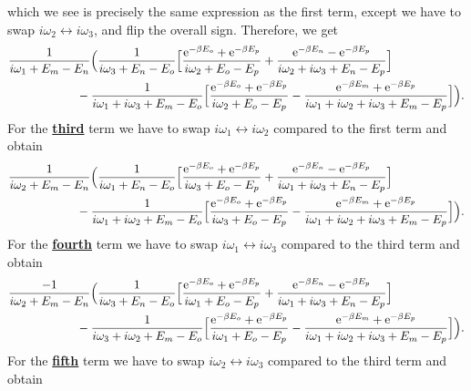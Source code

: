 \documentclass[12pt,a4paper]{scrartcl}
\numberwithin{equation}{section}
\renewcommand{\exp}[1]{\mathrm{e}^{#1}}
\begin{document}
which we see is precisely the same expression as the first term, except we have to swap $i\omega_2 \leftrightarrow i\omega_3$,
and flip the overall sign.
Therefore, we get
\begin{align}
   & 
 \frac{1}{i\omega_1 +E_m-E_n}
 \Big( \frac{1}{i\omega_3 +E_n-E_o}
 \Big[
 \frac{\exp{-\beta E_o}+\exp{-\beta E_p} }{i\omega_2 +E_o-E_p} 
  + \frac{ \exp{-\beta E_n} - \exp{-\beta E_p} }{ i\omega_2 + i\omega_3 + E_n- E_p } 
 \Big] \nonumber \\
 & \hspace*{2cm} -  \frac{1}{i\omega_1+ i\omega_3 + E_m-E_o}
 \Big[
  \frac{\exp{-\beta E_o}+\exp{-\beta E_p} }{i\omega_2 +E_o-E_p} 
 -  \frac{ \exp{-\beta E_m}+\exp{-\beta E_p} }{ i\omega_1 + i\omega_2 + i\omega_3 + E_m- E_p } 
 \Big]
 \Big)  .
\end{align}
For the \textbf{\underline{third}} term we have to swap $i\omega_1 \leftrightarrow i\omega_2$ compared to the first term and obtain
\begin{align}
    &
 \frac{1}{i\omega_2 +E_m-E_n}
 \Big( \frac{1}{i\omega_1 +E_n-E_o}
 \Big[
 \frac{\exp{-\beta E_o}+\exp{-\beta E_p} }{i\omega_3 +E_o-E_p} 
  + \frac{ \exp{-\beta E_n} - \exp{-\beta E_p} }{ i\omega_1 + i\omega_3 + E_n- E_p } 
 \Big] \nonumber \\
 & \hspace*{2cm} -  \frac{1}{i\omega_1+ i\omega_2 + E_m-E_o}
 \Big[
  \frac{\exp{-\beta E_o}+\exp{-\beta E_p} }{i\omega_3 +E_o-E_p} 
 -  \frac{ \exp{-\beta E_m}+\exp{-\beta E_p} }{ i\omega_1 + i\omega_2 + i\omega_3 + E_m- E_p } 
 \Big]
 \Big) .
\end{align}
For the \textbf{\underline{fourth}} term we have to swap $i\omega_1 \leftrightarrow i\omega_3$ compared to the third term and obtain
\begin{align}
    &
 \frac{-1}{i\omega_2 +E_m-E_n}
 \Big( \frac{1}{i\omega_3 +E_n-E_o}
 \Big[
 \frac{\exp{-\beta E_o}+\exp{-\beta E_p} }{i\omega_1 +E_o-E_p} 
  + \frac{ \exp{-\beta E_n} - \exp{-\beta E_p} }{ i\omega_1 + i\omega_3 + E_n- E_p } 
 \Big] \nonumber \\
 & \hspace*{2cm} -  \frac{1}{i\omega_3+ i\omega_2 + E_m-E_o}
 \Big[
  \frac{\exp{-\beta E_o}+\exp{-\beta E_p} }{i\omega_1 +E_o-E_p} 
 -  \frac{ \exp{-\beta E_m}+\exp{-\beta E_p} }{ i\omega_1 + i\omega_2 + i\omega_3 + E_m- E_p } 
 \Big]
 \Big) .
\end{align}
For the \textbf{\underline{fifth}} term we have to swap $i\omega_2 \leftrightarrow i\omega_3$ compared to the third term and obtain
\end{document}
